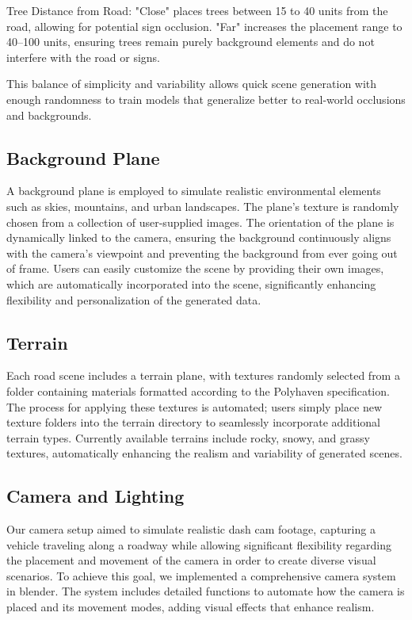 \documentclass[journal]{IEEEtran}
\begin{document}
Tree Distance from Road:
"Close" places trees between 15 to 40 units from the road, allowing for potential sign occlusion.
"Far" increases the placement range to 40–100 units, ensuring trees remain purely background elements and do not interfere with the road or signs.

This balance of simplicity and variability allows quick scene generation with enough randomness to train models that generalize better to real-world occlusions and backgrounds.

\subsection{Background Plane} A background plane is employed to simulate realistic environmental elements such as skies, mountains, and urban landscapes. The plane’s texture is randomly chosen from a collection of user-supplied images. The orientation of the plane is dynamically linked to the camera, ensuring the background continuously aligns with the camera's viewpoint and preventing the background from ever going out of frame. Users can easily customize the scene by providing their own images, which are automatically incorporated into the scene, significantly enhancing flexibility and personalization of the generated data.

\subsection{Terrain} Each road scene includes a terrain plane, with textures randomly selected from a folder containing materials formatted according to the Polyhaven specification. The process for applying these textures is automated; users simply place new texture folders into the terrain directory to seamlessly incorporate additional terrain types. Currently available terrains include rocky, snowy, and grassy textures, automatically enhancing the realism and variability of generated scenes.

\subsection{Camera and Lighting}
Our camera setup aimed to simulate realistic dash cam footage, capturing a vehicle traveling along a roadway while allowing significant flexibility regarding the placement and movement of the camera in order to create diverse visual scenarios. To achieve this goal, we implemented a comprehensive camera system in blender. The system includes detailed functions to automate how the camera is placed and its movement modes, adding visual effects that enhance realism.
\end{document}
